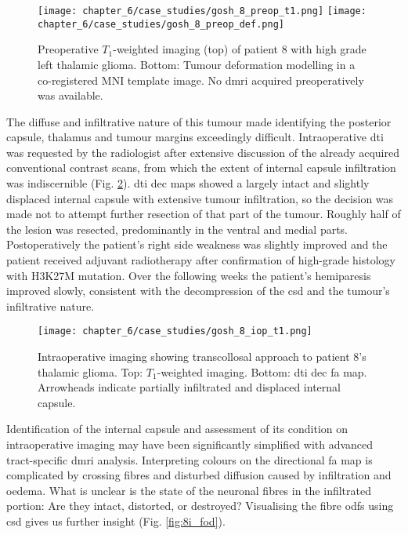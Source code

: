 \begin{figure}[htb!]
  \centering
  \texttt{[image: chapter\_6/case\_studies/gosh\_8\_preop\_t1.png]}
  \texttt{[image: chapter\_6/case\_studies/gosh\_8\_preop\_def.png]}
  \caption{Preoperative $T_1$-weighted imaging (top) of patient 8 with high grade left thalamic glioma. Bottom: Tumour deformation modelling in a co-registered MNI template image. No \gls{dmri} acquired preoperatively was available.}
  \label{fig:8p}
\end{figure}

The diffuse and infiltrative nature of this tumour made identifying the posterior capsule, thalamus and tumour margins exceedingly difficult.
Intraoperative \gls{dti} was requested by the radiologist after extensive discussion of the already acquired conventional contrast scans, from which the extent of internal capsule infiltration was indiscernible (Fig. \ref{fig:8i}).
\Gls{dti} \gls{dec} maps showed a largely intact and slightly displaced internal capsule with extensive tumour infiltration, so the decision was made not to attempt further resection of that part of the tumour.
Roughly half of the lesion was resected, predominantly in the ventral and medial parts.
Postoperatively the patient's right side weakness was slightly improved and the patient received adjuvant radiotherapy after confirmation of high-grade histology with H3K27M mutation.
Over the following weeks the patient's hemiparesis improved slowly, consistent with the decompression of the \gls{csd} and the tumour's infiltrative nature.

\begin{figure}
  \centering
  \texttt{[image: chapter\_6/case\_studies/gosh\_8\_iop\_t1.png]}
  
  \caption{Intraoperative imaging showing transcollosal approach to patient 8's thalamic glioma. Top: $T_1$-weighted imaging. Bottom: \gls{dti} \gls{dec} \gls{fa} map. Arrowheads indicate partially infiltrated and displaced internal capsule.}
  \label{fig:8i}
\end{figure}

Identification of the internal capsule and assessment of its condition on intraoperative imaging may have been significantly simplified with advanced tract-specific \gls{dmri} analysis.
Interpreting colours on the directional \gls{fa} map is complicated by crossing fibres and disturbed diffusion caused by infiltration and oedema.
What is unclear is the state of the neuronal fibres in the infiltrated portion: Are they intact, distorted, or destroyed?
Visualising the fibre \glspl{odf} using \gls{csd} gives us further insight (Fig. \ref{fig:8i_fod}).

